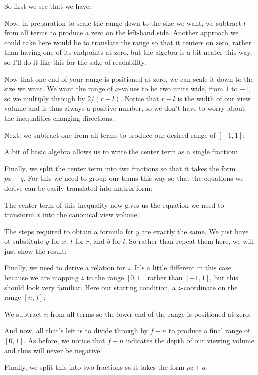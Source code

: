 	So first we see that we have:
	
	Now, in preparation to scale the range down to the size we want, we subtract $l$ from all terms to produce a zero on the left-hand side. Another approach we could take here would be to translate the range so that it centers on zero, rather than having one of its endpoints at zero, but the algebra is a bit neater this way, so I'll do it like this for the sake of readability:
	
	Now that one end of your range is positioned at zero, we can scale it down to the size we want. We want the range of $x$-values to be two units wide, from $1$ to $-1$, so we multiply through by $2/(r - l)$. Notice that $r - l$ is the width of our view volume and is thus always a positive number, so we don't have to worry about the inequalities changing directions:
	
	Next, we subtract one from all terms to produce our desired range of $[-1, 1]$:
	
	A bit of basic algebra allows us to write the center term as a single fraction:
	
	Finally, we split the center term into two fractions so that it takes the form $px + q$. For this we need to group our terms this way so that the equations we derive can be easily translated into matrix form:
	
	The center term of this inequality now gives us the equation we need to transform $x$ into the canonical view volume:
	
	The steps required to obtain a formula for $y$ are exactly the same. We just have ot substitute $y$ for $x$, $t$ for $r$, and $b$ for $l$. So rather than repeat them here, we will just show the result:
	
	Finally, we need to derive a relation for $z$. It's a little different in this case because we are mapping $z$ to the range $[0, 1]$ rather than $[-1, 1]$, but this should look very familiar. Here our starting condition, a $z$-coordinate on the range $[n, f]$:
	
	We subtract $n$ from all terms so the lower end of the range is positioned at zero:
	
	And now, all that's left is to divide through by $f - n$ to produce a final range of $[0, 1]$. As before, we notice that $f - n$ indicates the depth of our viewing volume and thus will never be negative:
	
	Finally, we split this into two fractions so it takes the form $pz + q$:
	
